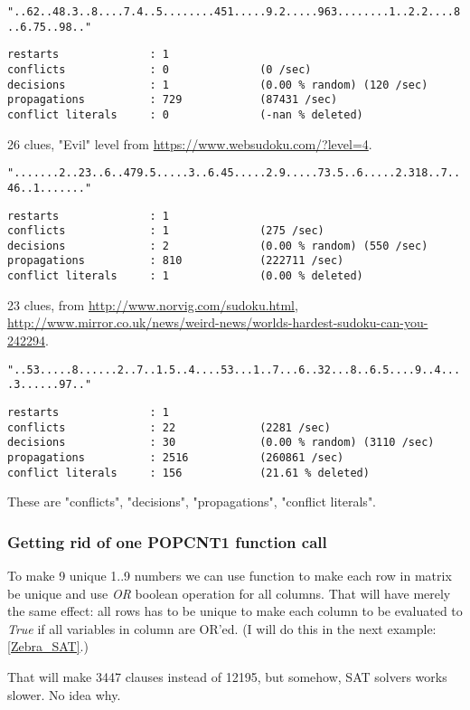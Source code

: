 \verb|"..62..48.3..8....7.4..5........451.....9.2.....963........1..2.2....8..6.75..98.."|

\begin{lstlisting}
restarts              : 1
conflicts             : 0              (0 /sec)
decisions             : 1              (0.00 % random) (120 /sec)
propagations          : 729            (87431 /sec)
conflict literals     : 0              (-nan % deleted)
\end{lstlisting}

26 clues, "Evil" level from \url{https://www.websudoku.com/?level=4}.

\verb|".......2..23..6..479.5.....3..6.45.....2.9.....73.5..6.....2.318..7..46..1......."|

\begin{lstlisting}
restarts              : 1
conflicts             : 1              (275 /sec)
decisions             : 2              (0.00 % random) (550 /sec)
propagations          : 810            (222711 /sec)
conflict literals     : 1              (0.00 % deleted)
\end{lstlisting}

23 clues, from
\url{http://www.norvig.com/sudoku.html},
\url{http://www.mirror.co.uk/news/weird-news/worlds-hardest-sudoku-can-you-242294}.

\verb|"..53.....8......2..7..1.5..4....53...1..7...6..32...8..6.5....9..4....3......97.."|

\begin{lstlisting}
restarts              : 1
conflicts             : 22             (2281 /sec)
decisions             : 30             (0.00 % random) (3110 /sec)
propagations          : 2516           (260861 /sec)
conflict literals     : 156            (21.61 % deleted)
\end{lstlisting}

These are "conflicts", "decisions", "propagations", "conflict literals".

\subsubsection{Getting rid of one POPCNT1 function call}
\label{OR_in_POPCNT1}

To make 9 unique 1..9 numbers we can use  function to make each row in matrix be unique and
use \emph{OR} boolean operation for all columns.
That will have merely the same effect: all rows has to be unique to make each column to be evaluated
to \emph{True} if all variables in column are OR'ed.
(I will do this in the next example: \ref{Zebra_SAT}.)

That will make 3447 clauses instead of 12195, but somehow, SAT solvers works slower. No idea why.

